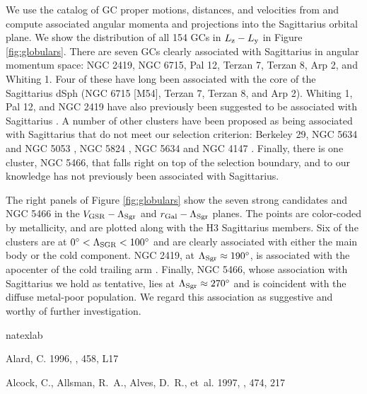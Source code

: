 \documentclass[twocolumn,tighten,twocolappendix]{aastex63}
\newcommand{\sgr}{Sagittarius}
\newcommand{\Ly}{L_{\rm y}}
\newcommand{\Lz}{L_{\rm z}}
\newcommand{\Vgsr}{V_{\rm GSR}}
\begin{document}
\begin{CJK*}{UTF8}{gbsn}
\begin{appendix}
We use the catalog of GC proper motions, distances, and velocities from \citet{Baumgardt19} and compute associated angular momenta and projections into the \sgr{} orbital plane.  We show the distribution of all 154 GCs in $\Lz-\Ly$ in Figure \ref{fig:globulars}.  There are seven GCs clearly associated with \sgr{} in angular momentum space: NGC 2419, NGC 6715, Pal 12, Terzan 7, Terzan 8, Arp 2, and Whiting 1.  Four of these have long been associated with the core of the \sgr{} dSph (NGC 6715 [M54], Terzan 7, Terzan 8, and Arp 2).  Whiting 1, Pal 12, and NGC 2419 have also previously been suggested to be associated with \sgr{} \citep[e.g.,][]{Newberg03, Law10b, Belokurov14, Massari19, Bellazzini20}.  A number of other clusters have been proposed as being associated with \sgr{} that do not meet our selection criterion: Berkeley 29, NGC 5634 and NGC 5053 \citep{Law10b}, NGC 5824 \citep{Massari19}, NGC 5634 and NGC 4147 \citep{Bellazzini20}.  Finally, there is one cluster, NGC 5466, that falls right on top of the selection boundary, and to our knowledge has not previously been associated with \sgr{}.

The right panels of Figure \ref{fig:globulars} show the seven strong candidates and NGC 5466 in the $\Vgsr-\Lambda_{\rm Sgr}$ and $r_{\rm Gal}-\Lambda_{\rm Sgr}$ planes.  The points are color-coded by metallicity, and are plotted along with the H3 \sgr{} members.  Six of the clusters are at $0^\circ < \Lambda_{\rm SGR}<100^\circ$ and are clearly associated with either the main body or the cold component.  NGC 2419, at $\Lambda_{\rm Sgr}\approx 190^\circ$, is associated with the apocenter of the cold trailing arm \citep{Newberg03, Belokurov14}.  Finally, NGC 5466, whose association with \sgr{} we hold as tentative, lies at $\Lambda_{\rm Sgr}\approx 270^\circ$ and is coincident with the diffuse metal-poor population.  We regard this association as suggestive and worthy of further investigation.

\end{appendix}

\begin{thebibliography}{}
\expandafter\ifx\csname natexlab\endcsname\relax\def\natexlab#1{#1}\fi
\providecommand{\url}[1]{\href{#1}{#1}}

{Alard}, C. 1996, \apjl, 458, L17

{Alcock}, C., {Allsman}, R.~A., {Alves}, D.~R., {et~al.} 1997, \apj, 474, 217


\end{thebibliography}
\end{CJK*}
\end{document}
